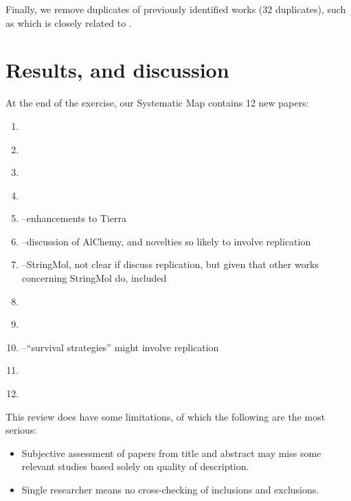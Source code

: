 
Finally, we remove duplicates of previously identified works (32 duplicates), such as \cite{smFaulconbridgeStepneyMillerEtAl2011} which is closely related to \cite{Faulconbridge2011, Faulconbridge2010}.

\section{Results, and discussion}

At the end of the exercise, our Systematic Map contains 12 new papers:
\begin{enumerate}
\item \cite{smAdamsLipson2003}
\item \cite{smBobrikKvasnickaPospichal2008a}
\item \cite{smBobrikKvasnickaPospichal2008}
\item \cite{smEllabaan2007}
\item \cite{smSugiuraSuzukiShioseEtAl2003}--enhancements to Tierra
\item \cite{smFenizioMatsumaruDittrich2011}--discussion of AlChemy, and novelties so likely to involve replication
\item \cite{smHickinbothamClarkNellisEtAl2016}--StringMol, not clear if discuss replication, but given that other works concerning StringMol do, included
\item \cite{smHinzeFaslerLenserEtAl2009}
\item \cite{smSuzuki2003a}
\item \cite{smBanzhafDittrichEller1999}--``survival strategies'' might involve replication
\item \cite{smGordon-Smith2011}
\item \cite{smGohEweGoh2014}
\end{enumerate}

This review does have some limitations, of which the following are the most serious:
\begin{itemize}
	\item Subjective assessment of papers from title and abstract may miss some relevant studies based solely on quality of description.
	\item Single researcher means no cross-checking of inclusions and exclusions.
\end{itemize}

